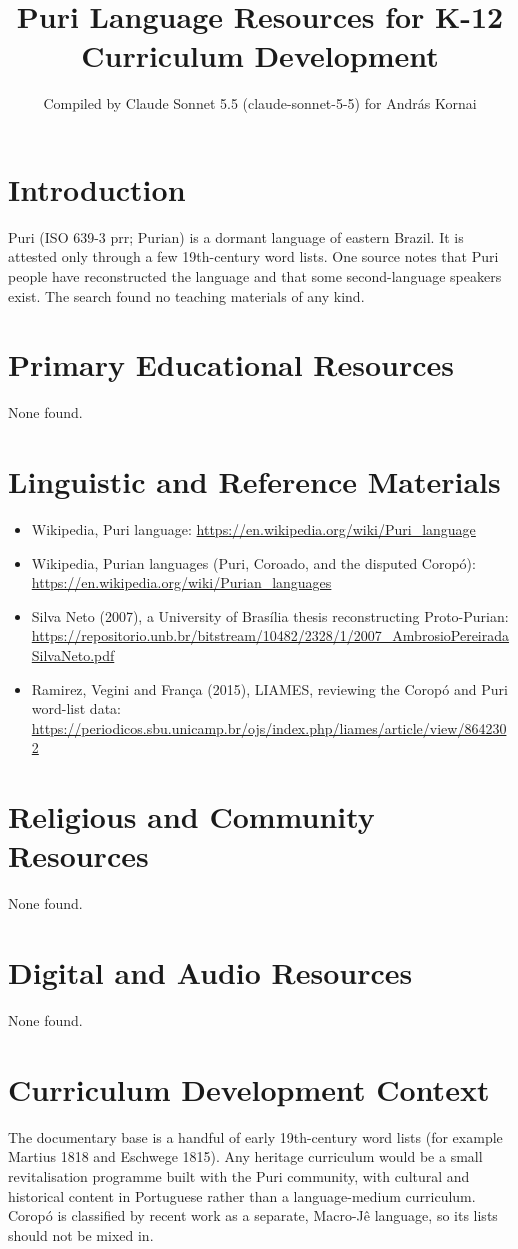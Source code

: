 \documentclass[12pt]{article}
\title{Puri Language Resources for K-12 Curriculum Development}
\author{Compiled by Claude Sonnet 5.5 (claude-sonnet-5-5) for Andr\'as Kornai}
\date{}
\begin{document}
\maketitle

\section{Introduction}
Puri (ISO 639-3 prr; Purian) is a dormant language of eastern Brazil. It is attested only through a few 19th-century word lists. One source notes that Puri people have reconstructed the language and that some second-language speakers exist. The search found no teaching materials of any kind.

\section{Primary Educational Resources}
None found.

\section{Linguistic and Reference Materials}
\begin{itemize}
\item Wikipedia, Puri language: \url{https://en.wikipedia.org/wiki/Puri_language}
\item Wikipedia, Purian languages (Puri, Coroado, and the disputed Corop\'o): \url{https://en.wikipedia.org/wiki/Purian_languages}
\item Silva Neto (2007), a University of Bras\'ilia thesis reconstructing Proto-Purian: \url{https://repositorio.unb.br/bitstream/10482/2328/1/2007_AmbrosioPereiradaSilvaNeto.pdf}
\item Ramirez, Vegini and Fran\c{c}a (2015), LIAMES, reviewing the Corop\'o and Puri word-list data: \url{https://periodicos.sbu.unicamp.br/ojs/index.php/liames/article/view/8642302}
\end{itemize}

\section{Religious and Community Resources}
None found.

\section{Digital and Audio Resources}
None found.

\section{Curriculum Development Context}
The documentary base is a handful of early 19th-century word lists (for example Martius 1818 and Eschwege 1815). Any heritage curriculum would be a small revitalisation programme built with the Puri community, with cultural and historical content in Portuguese rather than a language-medium curriculum. Corop\'o is classified by recent work as a separate, Macro-J\^e language, so its lists should not be mixed in.
\end{document}
